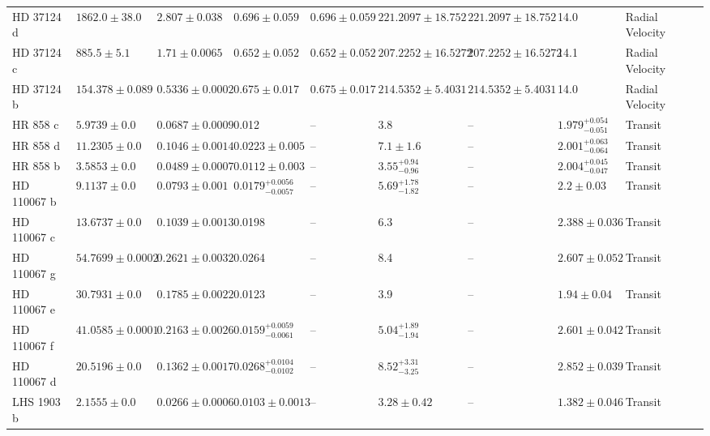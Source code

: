 \begin{tabular}{llllllllll}
HD 37124 d & $1862.0 \pm 38.0$ & $2.807 \pm 0.038$ & $0.696 \pm 0.059$ & $0.696 \pm 0.059$ & $221.2097 \pm 18.752$ & $221.2097 \pm 18.752$ & 14.0 & Radial Velocity & \cite{WRIGHT_ET_AL__2011} \\
HD 37124 c & $885.5 \pm 5.1$ & $1.71 \pm 0.0065$ & $0.652 \pm 0.052$ & $0.652 \pm 0.052$ & $207.2252 \pm 16.5272$ & $207.2252 \pm 16.5272$ & 14.1 & Radial Velocity & \cite{WRIGHT_ET_AL__2011} \\
HD 37124 b & $154.378 \pm 0.089$ & $0.5336 \pm 0.0002$ & $0.675 \pm 0.017$ & $0.675 \pm 0.017$ & $214.5352 \pm 5.4031$ & $214.5352 \pm 5.4031$ & 14.0 & Radial Velocity & \cite{WRIGHT_ET_AL__2011} \\
HR 858 c & $5.9739 \pm 0.0$ & $0.0687 \pm 0.0009$ & 0.012 & -- & 3.8 & -- & $1.979^{+0.054}_{-0.051}$ & Transit & \cite{BONFANTI_ET_AL__2025} \\
HR 858 d & $11.2305 \pm 0.0$ & $0.1046 \pm 0.0014$ & $0.0223 \pm 0.005$ & -- & $7.1 \pm 1.6$ & -- & $2.001^{+0.063}_{-0.064}$ & Transit & \cite{BONFANTI_ET_AL__2025} \\
HR 858 b & $3.5853 \pm 0.0$ & $0.0489 \pm 0.0007$ & $0.0112 \pm 0.003$ & -- & $3.55^{+0.94}_{-0.96}$ & -- & $2.004^{+0.045}_{-0.047}$ & Transit & \cite{BONFANTI_ET_AL__2025} \\
HD 110067 b & $9.1137 \pm 0.0$ & $0.0793 \pm 0.001$ & $0.0179^{+0.0056}_{-0.0057}$ & -- & $5.69^{+1.78}_{-1.82}$ & -- & $2.2 \pm 0.03$ & Transit & \cite{LUQUE_ET_AL__2023} \\
HD 110067 c & $13.6737 \pm 0.0$ & $0.1039 \pm 0.0013$ & 0.0198 & -- & 6.3 & -- & $2.388 \pm 0.036$ & Transit & \cite{LUQUE_ET_AL__2023} \\
HD 110067 g & $54.7699 \pm 0.0002$ & $0.2621 \pm 0.0032$ & 0.0264 & -- & 8.4 & -- & $2.607 \pm 0.052$ & Transit & \cite{LUQUE_ET_AL__2023} \\
HD 110067 e & $30.7931 \pm 0.0$ & $0.1785 \pm 0.0022$ & 0.0123 & -- & 3.9 & -- & $1.94 \pm 0.04$ & Transit & \cite{LUQUE_ET_AL__2023} \\
HD 110067 f & $41.0585 \pm 0.0001$ & $0.2163 \pm 0.0026$ & $0.0159^{+0.0059}_{-0.0061}$ & -- & $5.04^{+1.89}_{-1.94}$ & -- & $2.601 \pm 0.042$ & Transit & \cite{LUQUE_ET_AL__2023} \\
HD 110067 d & $20.5196 \pm 0.0$ & $0.1362 \pm 0.0017$ & $0.0268^{+0.0104}_{-0.0102}$ & -- & $8.52^{+3.31}_{-3.25}$ & -- & $2.852 \pm 0.039$ & Transit & \cite{LUQUE_ET_AL__2023} \\
LHS 1903 b & $2.1555 \pm 0.0$ & $0.0266 \pm 0.0006$ & $0.0103 \pm 0.0013$ & -- & $3.28 \pm 0.42$ & -- & $1.382 \pm 0.046$ & Transit & \cite{WILSON_ET_AL_2026} \\

\end{tabular}
